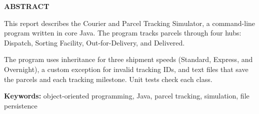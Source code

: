 \thispagestyle{plain}
\begin{center}
{\bfseries\fontsize{14}{17}\selectfont ABSTRACT}
\end{center}
\vspace{0.5cm}

This report describes the Courier and Parcel Tracking Simulator, a command-line
program written in core Java. The program tracks parcels through four hubs:
Dispatch, Sorting Facility, Out-for-Delivery, and Delivered.

The program uses inheritance for three shipment speeds (Standard, Express, and
Overnight), a custom exception for invalid tracking IDs, and text files that
save the parcels and each tracking milestone. Unit tests check each class.

\vspace{1cm}
\noindent\textbf{Keywords:} object-oriented programming, Java, parcel tracking,
simulation, file persistence
\clearpage

